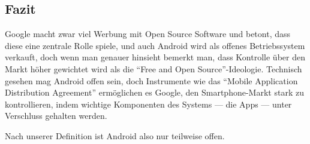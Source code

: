 \subsection{Fazit}
Google macht zwar viel Werbung mit Open Source Software und betont, dass diese eine zentrale Rolle spiele\thinspace\cite{online:google-open-source}, und auch Android wird als offenes Betriebssystem verkauft\thinspace\cite{online:android-open-source}, doch wenn man genauer hinsieht bemerkt man, dass Kontrolle über den Markt höher gewichtet wird als die ``Free and Open Source''-Ideologie. Technisch gesehen mag Android offen sein, doch Instrumente wie das ``Mobile Application Distribution Agreement'' ermöglichen es Google, den \mbox{Smartphone-Markt} stark zu kontrollieren, indem wichtige Komponenten des Systems --- die Apps --- unter Verschluss gehalten werden. 

Nach unserer Definition ist Android also nur teilweise offen.